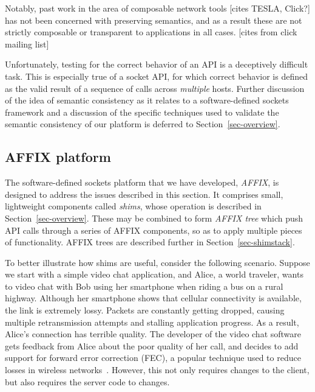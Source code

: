 Notably, past work in the area of 
composable network tools [cites TESLA, Click?]
has not been concerned with preserving semantics, and as a result these are 
not strictly composable or transparent to applications in all cases. [cites from click 
mailing list]

Unfortunately, testing for the correct behavior of an API is a deceptively difficult 
task. This is especially true of a socket API, for which correct behavior is defined 
as the valid result of a sequence of calls across \emph{multiple} hosts.
Further discussion of the idea of semantic consistency as it relates to a
software-defined sockets framework and a discussion of the 
specific techniques used to validate the semantic consistency of our 
platform is deferred to Section~\ref{sec-overview}.

\subsection{AFFIX platform}
\label{subsec:overview-affix}

The software-defined sockets platform that we have developed, \emph{AFFIX}, 
is designed to address the issues described in this section. 
It comprises small, lightweight components 
called \emph{shims}, whose operation is described in Section~\ref{sec-overview}. 
These may be combined to form  
\emph{AFFIX tree} which push API calls through a series of AFFIX components,
so as to apply multiple pieces of functionality.  AFFIX trees are described 
further in Section~\ref{sec-shimstack}. 


\iffalse
To better illustrate how shims are useful, consider the following scenario.  Suppose we start with a simple video chat application, and Alice, a world traveler, wants to video chat with Bob using her smartphone when riding a bus on a rural highway. Although her smartphone shows that cellular connectivity is available, the link is extremely lossy. Packets are constantly getting dropped, causing multiple retransmission attempts and stalling application progress. As a result, Alice's connection has terrible quality.   The developer of the video chat software gets feedback from Alice about the poor quality of her call, and decides to add support for forward error correction (FEC), 
a popular technique used to reduce losses in wireless networks~\cite{fec_wireless1, fec_wireless2}. However, this not only requires changes to the client, but also requires the server code to changes.   

